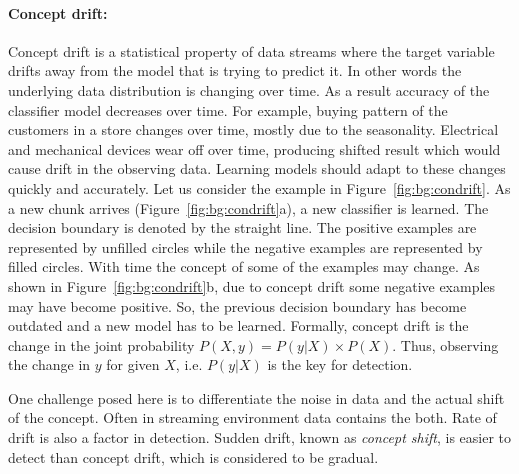 \paragraph{Concept drift:}
Concept drift is a statistical property of data streams where the target variable drifts away from the model that is trying to predict it. In other words the underlying data distribution is changing over time. As a result accuracy of the classifier model decreases over time. For example, buying pattern of the customers in a store changes over time, mostly due to the seasonality. Electrical and mechanical devices wear off over time, producing shifted result which would cause drift in the observing data. Learning models should adapt to these changes quickly and accurately. Let us consider the example in Figure~\ref{fig:bg:condrift}. As a new chunk arrives (Figure~\ref{fig:bg:condrift}a), a new classifier is learned. The decision boundary is denoted by the straight line. The positive examples are represented by unfilled circles while the negative examples are represented by filled circles. With time the concept of some of the examples may change. As shown in Figure~\ref{fig:bg:condrift}b, due to concept drift some negative examples may have become positive. So, the previous decision boundary has become outdated and a new model has to be learned. Formally, concept drift is the change in the joint probability \(P(X, y) = P(y|X) \times P(X)\). Thus, observing the change in $y$ for given $X$, i.e. $P(y|X)$ is the key for detection.

One challenge posed here is to differentiate the noise in data and the actual shift of the concept. Often in streaming environment data contains the both. Rate of drift is also a factor in detection. Sudden drift, known as {\it concept shift}, is easier to detect than concept drift, which is considered to be gradual.

